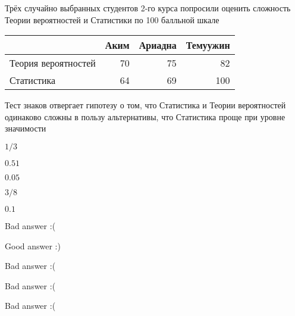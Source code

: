 
\begin{question}
Трёх случайно выбранных студентов 2-го курса попросили оценить сложность
Теории вероятностей и Статистики по 100 балльной шкале

\vspace{5mm}
\begin{tabular}{lrrr}
\toprule
& Аким & Ариадна & Темуужин \\
\midrule
Теория вероятностей & 70 & 75 & 82 \\
Статистика & 64 & 69 & 100 \\
\bottomrule
\end{tabular}
\vspace{5mm}

Тест знаков отвергает гипотезу о том, что Статистика и Теории
вероятностей одинаково сложны в пользу альтернативы, что Статистика
проще при уровне значимости
\begin{answerlist}
  \item \(1/3\)
  \item \(0.51\)
  \item \(0.05\)
  \item \(3/8\)
  \item \(0.1\)
\end{answerlist}
\end{question}

\begin{solution}
\begin{answerlist}
  \item Bad answer :(
  \item Good answer :)
  \item Bad answer :(
  \item Bad answer :(
  \item Bad answer :(
\end{answerlist}
\end{solution}


